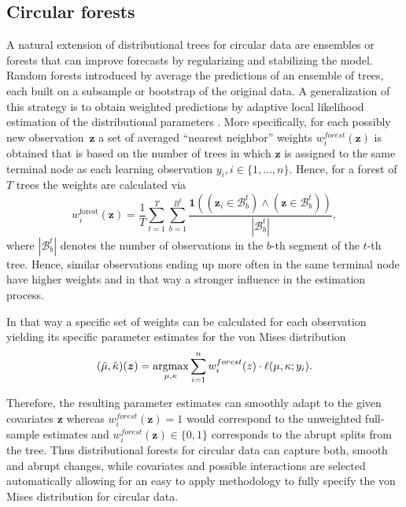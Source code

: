 \documentclass[nojss]{jss}
\numberwithin{equation}{section}
\begin{document}
\subsection{Circular forests}
\label{sec:circforest}
A natural extension of distributional trees for circular data are ensembles or forests 
that can improve forecasts by regularizing and stabilizing the model.
Random forests introduced by \cite{Breiman:2001} average the predictions of an ensemble
of trees, each built on a subsample or bootstrap of the original data. 
A generalization of this strategy is to obtain weighted predictions by adaptive local 
likelihood estimation of the distributional parameters 
\citep[Section~2.3. of][]{Schlosser+Hothorn+Stauffer:2019, Hothorn+Zeileis:2017}. 
More specifically, for each possibly new observation~$\bm{z}$ a set of averaged ``nearest neighbor''
weights $w_i^{forest}(\bm{z})$ 
is obtained that is based on the number of trees in which $\bm{z}$ is assigned to the same terminal 
node as each learning observation $y_i, i \in \{1,\ldots,n\}$.
Hence, for a forest of $T$ trees the weights are calculated via
\begin{equation}
w^{\text{forest}}_i(\bm{z}) = \frac{1}{T} \sum_{t=1}^T \sum_{b=1}^{B^t}
\frac{\mathbf{1}((\bm{z}_i \in \mathcal{B}^t_b) \land (\bm{z} \in \mathcal{B}^t_b))}{|\mathcal{B}^t_b|},
\end{equation}
where $|\mathcal{B}^t_b|$ denotes the number of observations in the $b$-th
segment of the $t$-th tree.
Hence, similar observations ending up more often in the same terminal node have higher weights
and in that way a stronger influence in the estimation process.

In that way a specific set of weights can be calculated for each observation yielding
its specific parameter estimates for the von Mises distribution
\begin{equation}
(\hat{\mu},\hat{\kappa})(\bm{z}) = \operatorname{argmax}\displaylimits_{\mu, \kappa} \sum_{i=1}^n w_i^{forest}(z) \cdot \ell(\mu, \kappa; y_i). 
\end{equation}

Therefore, the resulting parameter estimates can smoothly adapt to the given
covariates $\bm{z}$ whereas $w_i^{forest}(\bm{z}) = 1$ would correspond to the unweighted
full-sample estimates and $w_i^{forest}(\bm{z}) \in \{0, 1\}$ corresponds to the abrupt
splits from the tree.
Thus distributional forests for circular data can capture both, smooth and abrupt changes, while
covariates and possible interactions are selected automatically allowing for an easy to
apply methodology to fully specify the von Mises distribution for circular data.
\end{document}
